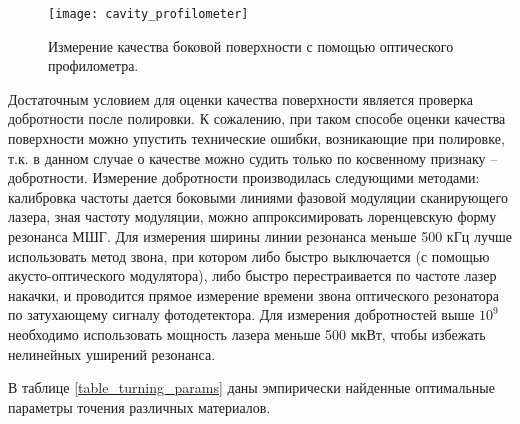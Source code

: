 \begin{figure}[ht]
\centering
  \texttt{[image: cavity\_profilometer]}
  \caption{Измерение качества боковой поверхности с помощью оптического профилометра.}
  \label{cavity_profilometer}
\end{figure}

Достаточным условием для оценки качества поверхности является проверка добротности после полировки. К сожалению, при таком способе оценки качества поверхности можно упустить технические ошибки, возникающие при полировке, т.к. в данном случае о качестве можно судить только по косвенному признаку – добротности. Измерение добротности производилась следующими методами: калибровка частоты дается боковыми линиями фазовой модуляции сканирующего лазера, зная частоту модуляции, можно аппроксимировать лоренцевскую форму резонанса МШГ. Для измерения ширины линии резонанса меньше 500 кГц лучше использовать метод звона, при котором либо быстро выключается (с помощью акусто-оптического модулятора), либо быстро перестраивается по частоте лазер накачки, и проводится прямое измерение времени звона оптического резонатора по затухающему сигналу фотодетектора. Для измерения добротностей выше $10^9$ необходимо использовать мощность лазера меньше 500 мкВт, чтобы избежать нелинейных уширений резонанса.

В таблице \ref{table_turning_params} даны эмпирически найденные оптимальные параметры точения различных материалов.

